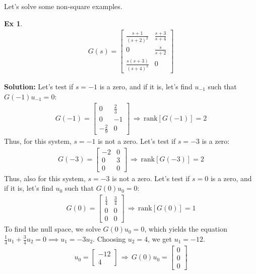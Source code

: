 \documentclass[twoside]{article}
\newtheorem{exmp}[theorem]{Ex}
\begin{document}
Let's solve some non-square examples.
%
\begin{exmp}
	\begin{align*}
	G(s) = \begin{bmatrix} \frac{s+1}{(s+2)^2} & \frac{s+3}{s+4}  \\  
	0 & \frac{s}{s+2}  
        \\
        \frac{s(s+3)}{(s+4)^2}  & 0
        \end{bmatrix}
	\end{align*}
\end{exmp}
%
\textbf{Solution:} Let's test if $s = -1$ is a zero, and if it is, let's find $u_{-1}$ such that $G(-1) u_{-1} = 0$:
%
\begin{align*}
	G(-1) = \begin{bmatrix} 0 & \frac{2}{3}  \\  
	0 & -1  
        \\
        -\frac{2}{9}  & 0
        \end{bmatrix} \, \Rightarrow \, \mathrm{rank}[G(-1)] = 2  
\end{align*}
%
Thus, for this system, $s = -1$ is not a zero. Let's test if $s = -3$ is a zero:
%
\begin{align*}
	G(-3) = \begin{bmatrix} -2 & 0 \\  
	0 & 3  
        \\
        0  & 0
        \end{bmatrix} \, \Rightarrow \, \mathrm{rank}[G(-3)] = 2  
\end{align*}
%
Thus, also for this system, $s = -3$ is not a zero. Let's test if $s = 0$ is a zero, and if it is, let's find $u_{0}$ such that $G(0) u_{0} = 0$:
%
\begin{align*}
	G(0) = \begin{bmatrix} \frac{1}{4} & \frac{3}{4}  \\  
	0 & 0
        \\
        0  & 0
        \end{bmatrix} \, \Rightarrow \, \mathrm{rank}[G(0)] = 1  
\end{align*}
%
To find the null space, we solve $G(0) u_0 = 0$, which yields the equation $\frac{1}{4}u_1 + \frac{3}{4}u_2 = 0 \implies u_1 = -3u_2$. Choosing $u_2 = 4$, we get $u_1 = -12$.
\begin{align*}
        u_0 = \begin{bmatrix} -12 \\ 4 \end{bmatrix} \, \Rightarrow \, G(0) u_0 = \begin{bmatrix} 0 \\ 0 \\ 0 \end{bmatrix}
\end{align*}
\end{document}
